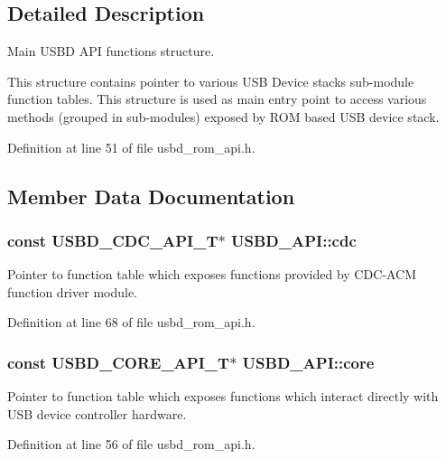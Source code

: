 \subsection{Detailed Description}
Main U\+S\+BD A\+PI functions structure.

This structure contains pointer to various U\+SB Device stack\textquotesingle{}s sub-\/module function tables. This structure is used as main entry point to access various methods (grouped in sub-\/modules) exposed by R\+OM based U\+SB device stack. 



Definition at line 51 of file usbd\+\_\+rom\+\_\+api.\+h.



\subsection{Member Data Documentation}
\subsubsection[{\texorpdfstring{cdc}{cdc}}]{\setlength{\rightskip}{0pt plus 5cm}const {\bf U\+S\+B\+D\+\_\+\+C\+D\+C\+\_\+\+A\+P\+I\+\_\+T}$\ast$ U\+S\+B\+D\+\_\+\+A\+P\+I\+::cdc}\hypertarget{structUSBD__API_a5560686e2f376096d2e1a640bb16bb84}{}\label{structUSBD__API_a5560686e2f376096d2e1a640bb16bb84}
Pointer to function table which exposes functions provided by C\+D\+C-\/\+A\+CM function driver module. 

Definition at line 68 of file usbd\+\_\+rom\+\_\+api.\+h.

\subsubsection[{\texorpdfstring{core}{core}}]{\setlength{\rightskip}{0pt plus 5cm}const {\bf U\+S\+B\+D\+\_\+\+C\+O\+R\+E\+\_\+\+A\+P\+I\+\_\+T}$\ast$ U\+S\+B\+D\+\_\+\+A\+P\+I\+::core}\hypertarget{structUSBD__API_a52b343de8166692bd2b4aecfb5eea59d}{}\label{structUSBD__API_a52b343de8166692bd2b4aecfb5eea59d}
Pointer to function table which exposes functions which interact directly with U\+SB device controller hardware. 

Definition at line 56 of file usbd\+\_\+rom\+\_\+api.\+h.

